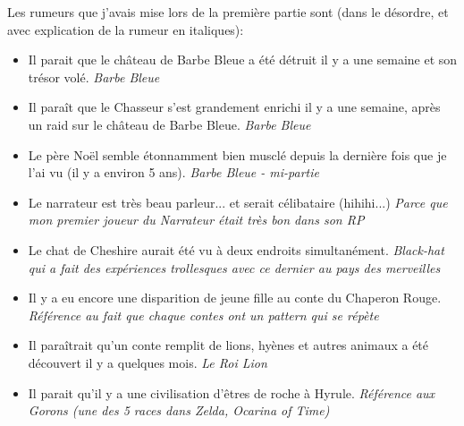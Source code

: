 {	\par Les rumeurs que j'avais mise lors de la première partie sont (dans le désordre, et avec explication de la rumeur en italiques):
	\begin{itemize}
		\item Il parait que le château de Barbe Bleue a été détruit il y a une semaine et son trésor volé. \emph{Barbe Bleue}
		\item Il paraît que le Chasseur s'est grandement enrichi il y a une semaine, après un raid sur le château de Barbe Bleue. \emph{Barbe Bleue}
		\item Le père Noël semble étonnamment bien musclé depuis la dernière fois que je l'ai vu (il y a environ 5 ans). \emph{Barbe Bleue - mi-partie}
		\item Le narrateur est très beau parleur... et serait célibataire (hihihi...) \emph{Parce que mon premier joueur du Narrateur était très bon dans son RP}
		\item Le chat de Cheshire aurait été vu à deux endroits simultanément. \emph{Black-hat qui a fait des expériences trollesques avec ce dernier au pays des merveilles}
		\item Il y a eu encore une disparition de jeune fille au conte du Chaperon Rouge. \emph{Référence au fait que chaque contes ont un pattern qui se répète}
		\item Il paraîtrait qu'un conte remplit de lions, hyènes et autres animaux a été découvert il y a quelques mois. \emph{Le Roi Lion}
		\item Il parait qu'il y a une civilisation d'êtres de roche à Hyrule. \emph{Référence aux Gorons (une des 5 races dans Zelda, Ocarina of Time)}
	\end{itemize}
	
}
